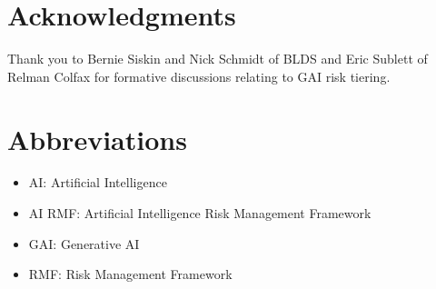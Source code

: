 \documentclass[fleqn]{article}
\begin{document}
\section*{Acknowledgments}

Thank you to Bernie Siskin and Nick Schmidt of BLDS and Eric Sublett of Relman Colfax for formative discussions relating to GAI risk tiering. 

\section*{Abbreviations}

\begin{itemize}
	\item AI: Artificial Intelligence
	\item AI RMF: Artificial Intelligence Risk Management Framework
	\item GAI: Generative AI
	\item RMF: Risk Management Framework
\end{itemize}



\end{document}
